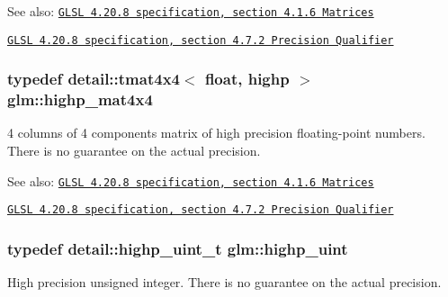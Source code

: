 \begin{Desc}
\item[See also:]\href{http://www.opengl.org/registry/doc/GLSLangSpec.4.20.8.pdf}{\tt GLSL 4.20.8 specification, section 4.1.6 Matrices} 

\href{http://www.opengl.org/registry/doc/GLSLangSpec.4.20.8.pdf}{\tt GLSL 4.20.8 specification, section 4.7.2 Precision Qualifier} \end{Desc}
\hypertarget{group__core__precision_g231950d260be295a25d7340e2020f55c}{
\subsubsection[highp\_\-mat4x4]{\setlength{\rightskip}{0pt plus 5cm}typedef detail::tmat4x4$<$ float, highp $>$ {\bf glm::highp\_\-mat4x4}}}
\label{group__core__precision_g231950d260be295a25d7340e2020f55c}


4 columns of 4 components matrix of high precision floating-point numbers. There is no guarantee on the actual precision.

\begin{Desc}
\item[See also:]\href{http://www.opengl.org/registry/doc/GLSLangSpec.4.20.8.pdf}{\tt GLSL 4.20.8 specification, section 4.1.6 Matrices} 

\href{http://www.opengl.org/registry/doc/GLSLangSpec.4.20.8.pdf}{\tt GLSL 4.20.8 specification, section 4.7.2 Precision Qualifier} \end{Desc}
\hypertarget{group__core__precision_gbfd1cf11193324a5f77d3831b6ac3205}{
\subsubsection[highp\_\-uint]{\setlength{\rightskip}{0pt plus 5cm}typedef detail::highp\_\-uint\_\-t {\bf glm::highp\_\-uint}}}
\label{group__core__precision_gbfd1cf11193324a5f77d3831b6ac3205}


High precision unsigned integer. There is no guarantee on the actual precision.

